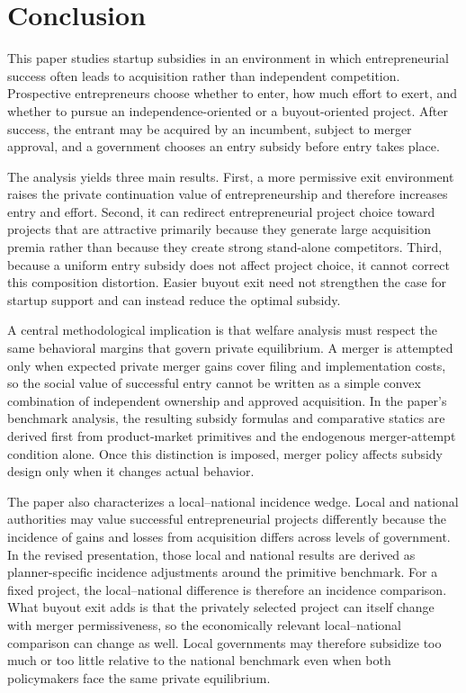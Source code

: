 \section{Conclusion}\label{sec:conclusion}

This paper studies startup subsidies in an environment in which entrepreneurial success often leads to acquisition rather than independent competition. Prospective entrepreneurs choose whether to enter, how much effort to exert, and whether to pursue an independence-oriented or a buyout-oriented project. After success, the entrant may be acquired by an incumbent, subject to merger approval, and a government chooses an entry subsidy before entry takes place.

The analysis yields three main results. First, a more permissive exit environment raises the private continuation value of entrepreneurship and therefore increases entry and effort. Second, it can redirect entrepreneurial project choice toward projects that are attractive primarily because they generate large acquisition premia rather than because they create strong stand-alone competitors. Third, because a uniform entry subsidy does not affect project choice, it cannot correct this composition distortion. Easier buyout exit need not strengthen the case for startup support and can instead reduce the optimal subsidy.

A central methodological implication is that welfare analysis must respect the same behavioral margins that govern private equilibrium. A merger is attempted only when expected private merger gains cover filing and implementation costs, so the social value of successful entry cannot be written as a simple convex combination of independent ownership and approved acquisition. In the paper's benchmark analysis, the resulting subsidy formulas and comparative statics are derived first from product-market primitives and the endogenous merger-attempt condition alone. Once this distinction is imposed, merger policy affects subsidy design only when it changes actual behavior.

The paper also characterizes a local--national incidence wedge. Local and national authorities may value successful entrepreneurial projects differently because the incidence of gains and losses from acquisition differs across levels of government. In the revised presentation, those local and national results are derived as planner-specific incidence adjustments around the primitive benchmark. For a fixed project, the local--national difference is therefore an incidence comparison. What buyout exit adds is that the privately selected project can itself change with merger permissiveness, so the economically relevant local--national comparison can change as well. Local governments may therefore subsidize too much or too little relative to the national benchmark even when both policymakers face the same private equilibrium.

